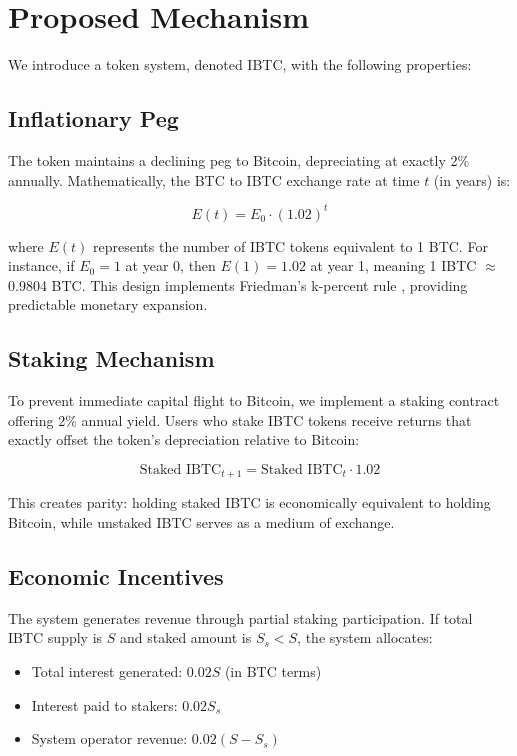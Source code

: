 \documentclass[11pt]{article}
\begin{document}
\section{Proposed Mechanism}

We introduce a token system, denoted IBTC, with the following properties:

\subsection{Inflationary Peg}
The token maintains a declining peg to Bitcoin, depreciating at exactly 2\% annually. Mathematically, the BTC to IBTC exchange rate at time $t$ (in years) is:

\begin{equation}
E(t) = E_0 \cdot (1.02)^t
\end{equation}

where $E(t)$ represents the number of IBTC tokens equivalent to 1 BTC. For instance, if $E_0 = 1$ at year 0, then $E(1) = 1.02$ at year 1, meaning 1 IBTC $\approx$ 0.9804 BTC. This design implements Friedman's k-percent rule \cite{friedman1968}, providing predictable monetary expansion.

\subsection{Staking Mechanism}
To prevent immediate capital flight to Bitcoin, we implement a staking contract offering 2\% annual yield. Users who stake IBTC tokens receive returns that exactly offset the token's depreciation relative to Bitcoin:

\begin{equation}
\text{Staked IBTC}_{t+1} = \text{Staked IBTC}_t \cdot 1.02
\end{equation}

This creates parity: holding staked IBTC is economically equivalent to holding Bitcoin, while unstaked IBTC serves as a medium of exchange.

\subsection{Economic Incentives}
The system generates revenue through partial staking participation. If total IBTC supply is $S$ and staked amount is $S_s < S$, the system allocates:
\begin{itemize}
    \item Total interest generated: $0.02S$ (in BTC terms)
    \item Interest paid to stakers: $0.02S_s$
    \item System operator revenue: $0.02(S - S_s)$
\end{itemize}
\end{document}
